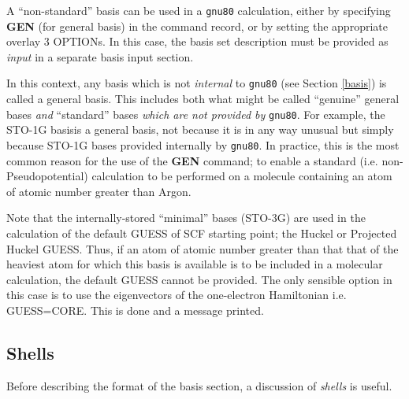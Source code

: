 A ``non-standard''
basis can be used in a {\tt gnu80} calculation, either by specifying
{\bf GEN} (for general basis) in the command record, or by setting the
appropriate overlay 3 OPTIONs.  In this case, the basis set description
must be provided as {\em input} in a separate basis input section.  

In this context, any basis which is not {\em internal} to {\tt gnu80}
(see Section \ref{basis}) is called a general basis. This includes
both what might be called ``genuine'' general bases {\em and}
``standard'' bases {\em which are not provided by } {\tt gnu80}.
For example, the STO-1G basisis a general basis,
not because it is in any way unusual but simply because STO-1G bases 
provided internally
by {\tt gnu80}. In practice, this is the most common reason for the
use of the {\bf GEN} command; to enable a standard 
(i.e. non-Pseudopotential) calculation to be performed
on a molecule containing an atom of atomic number greater than Argon.

Note that the internally-stored ``minimal'' bases
(STO-3G) are used in the calculation of the default GUESS of SCF
starting point; the Huckel or Projected Huckel GUESS. Thus, if
an atom of atomic number greater than that that of the heaviest atom for
which this basis is available is to be included in a molecular
calculation, the default GUESS cannot be provided. The only sensible
option in this case is to use the eigenvectors of the one-electron
Hamiltonian i.e.
GUESS=CORE. This is done and a message printed.
\subsection{\sf Shells}
Before describing
the format of the basis section, a discussion of {\em shells} is useful.

